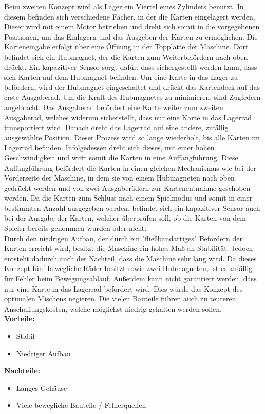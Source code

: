 Beim zweiten Konzept wird als Lager ein Viertel eines Zylinders benutzt. In diesem befinden
sich verschiedene Fächer, in der die Karten eingelagert werden. Dieser wird mit einem Motor betrieben
und dreht sich somit in die vorgegebenen Positionen, um das Einlagern und das Ausgeben der Karten zu ermöglichen.
Die Karteneingabe erfolgt über eine Öffnung in der Topplatte der Maschine. Dort befindet sich ein Hubmagnet, der die Karten
zum Weiterbefördern nach oben drückt. Ein kapazitiver Sensor sorgt dafür, dass sichergestellt werden kann, dass sich Karten auf dem Hubmagnet befinden.
Um eine Karte in das Lager zu befördern, wird der Hubmagnet eingeschaltet und drückt das Kartendeck auf das erste Ausgaberad. Um die Kraft des Hubmagnetes zu minimieren, sind Zugfedern angebracht.
Das Ausgaberad befördert eine Karte weiter zum zweiten Ausgaberad, welches widerum sicherstellt, dass nur eine Karte in das Lagerrad transportiert wird.
Danach dreht das Lagerrad auf eine andere, zufällig ausgewählte Position.
Dieser Prozess wird so lange wiederholt, bis alle Karten im Lagerrad befinden.
Infolgedessen dreht sich dieses, mit einer hohen Geschwindigkeit und wirft somit die Karten in eine Auffangführung.
Diese Auffangführung befördert die Karten in einen gleichen Mechanismus wie bei der Vorderseite der Maschine, in dem sie von einem Hubmagneten nach oben gedrückt werden und von zwei Ausgaberädern zur
Kartenentnahme geschoben werden.
Da die Karten zum Schluss nach einem Spielmodus und somit in einer bestimmten Anzahl ausgegeben werden, befindet sich ein kapazitiver Sensor auch bei der Ausgabe der Karten,
welcher überprüfen soll, ob die Karten von dem Spieler bereits genommen wurden oder nicht.\\

Durch den niedrigen Aufbau, der durch ein "fließbandartiges" Befördern der Karten erreicht wird, besitzt die Maschine ein hohes Maß an Stabilität. Jedoch entsteht dadurch auch der Nachteil, dass die Maschine sehr lang wird. Da dieses
Konzept fünf bewegliche Räder besitzt sowie zwei Hubmagneten, ist es anfällig für Fehler beim Bewegungsablauf.
Außerdem kann nicht garantiert werden, dass nur eine Karte in das Lagerrad befördert wird. Dies würde das Konzept des optimalen
Mischens negieren. Die vielen Bauteile führen auch zu teureren Anschaffungskosten, welche möglichst niedrig gehalten werden sollen.\\

\textbf{Vorteile:}
\begin{itemize}
    \item Stabil
    \item Niedriger Aufbau
\end{itemize}
\textbf{Nachteile:}
\begin{itemize}
    \item Langes Gehäuse
    \item Viele bewegliche Bauteile / Fehlerquellen
\end{itemize}

